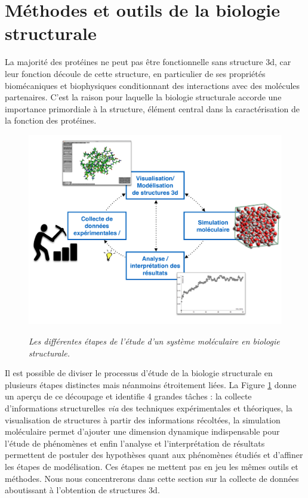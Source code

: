 \section{Méthodes et outils de la biologie structurale}

La majorité des protéines ne peut pas être fonctionnelle sans structure 3d, car leur fonction découle de cette structure, en particulier de ses propriétés biomécaniques et biophysiques conditionnant des interactions avec des molécules partenaires. C'est la raison pour laquelle la biologie structurale accorde une importance primordiale à la structure, élément central dans la caractérisation de la fonction des protéines.

\begin{figure}[h]
  \centering
  {\includegraphics[width=.75\linewidth]{./figures/ch1/structural_biology_process}}
    \caption{{\it Les différentes étapes de l'étude d'un système moléculaire en biologie structurale.}}
  \label{Fig:schema_seq_bio_struct}
  \hspace{0.2cm}
\end{figure}

Il est possible de diviser le processus d'étude de la biologie structurale en plusieurs étapes distinctes mais néanmoins étroitement liées. La Figure \ref{Fig:schema_seq_bio_struct} donne un aperçu de ce découpage et identifie 4 grandes tâches : la collecte d'informations structurelles \textit{via} des techniques expérimentales et théoriques, la visualisation de structures à partir des informations récoltées, la simulation moléculaire permet d'ajouter une dimension dynamique indispensable pour l'étude de phénomènes et enfin l'analyse et l'interprétation de résultats permettent de postuler des hypothèses quant aux phénomènes étudiés et d'affiner les étapes de modélisation.
Ces étapes ne mettent pas en jeu les mêmes outils et méthodes. Nous nous concentrerons dans cette section sur la collecte de données aboutissant à l'obtention de structures 3d.

